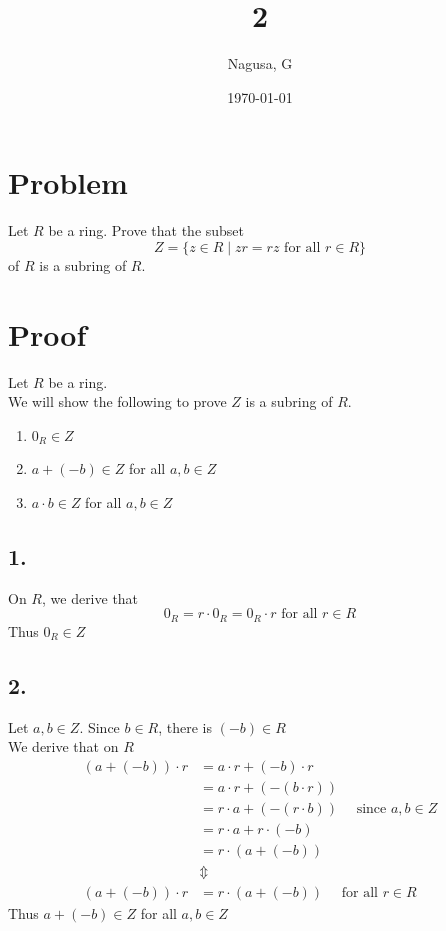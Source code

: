 \documentclass[11pt, a4paper]{article}
\title{2}
\author{Nagusa, G}
\date{\today}
\begin{document}
\maketitle

\section*{Problem}
Let $R$ be a ring. Prove that the subset
\[
Z =\{z \in R \mid zr=rz \text{ for all } r \in R\}
\]
of $R$ is a subring of $R$.

\section*{Proof}
Let $R$ be a ring.\\
We will show the following to prove $Z$ is a subring of $R$.
\begin{enumerate}
    \item $0_R \in Z$
    \item $a+(-b) \in Z$ for all $a,b \in Z$
    \item $a\cdot b \in Z$ for all $a,b\in Z$
\end{enumerate}

\subsection*{1.}
On $R$, we derive that
\[
0_R = r \cdot 0_R = 0_R \cdot r \text{ for all } r \in R
\]
Thus $0_R \in Z$

\subsection*{2.}
Let $a,b\in Z$. Since $b\in R$, there is $(-b)\in R$\\
We derive that on $R$
\begin{align*}
    (a+(-b))\cdot r
    &= a\cdot r + (-b)\cdot r\\
    &= a\cdot r + (-(b\cdot r))\\
    &= r\cdot a + (-(r\cdot b)) \quad \text{ since } a,b\in Z\\
    &= r\cdot a + r \cdot (-b)\\
    &= r\cdot (a+(-b))\\[10pt]
    &\Updownarrow\\[10pt]
    (a+(-b))\cdot r &= r\cdot (a+(-b)) \quad \text{ for all } r\in R
\end{align*}
Thus $a+(-b)\in Z$ for all $a,b\in Z$
\end{document}
